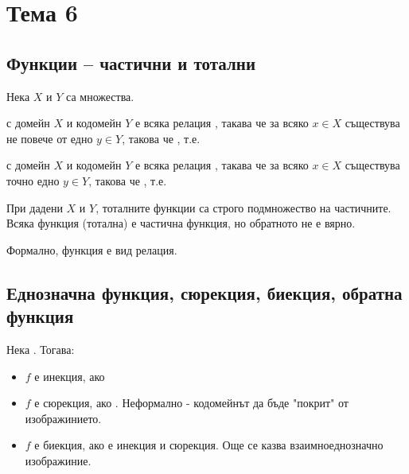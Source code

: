 \section{Тема 6}

\subsection*{Функции – частични и тотални}
Нека \(X\) и \(Y\) са множества.

\begin{definition}
     с домейн \(X\) и кодомейн \(Y\) е всяка 
    релация , такава че за всяко \(x \in X\) съществува не повече от едно 
    \(y \in Y\), такова че , т.е.

\end{definition}

\begin{definition}
     с домейн \(X\) и кодомейн \(Y\) е всяка 
    релация , такава че за всяко \(x \in X\) съществува точно едно 
    \(y \in Y\), такова че , т.е.

\end{definition}

При дадени \(X\) и \(Y\), тоталните функции са строго подмножество на частичните.
Всяка функция (тотална) е частична функция, но обратното не е вярно.

Формално, функция е вид релация.

\subsection*{Еднозначна функция, сюрекция, биекция, обратна функция}
Нека . Тогава: %
\begin{itemize}
    \item \(f\) е инекция, ако 
    \item \(f\) е сюрекция, ако . Неформално - кодомейнът да 
    бъде "покрит" от изображинието.
    \item \(f\) е биекция, ако е инекция и сюрекция. Още се казва взаимноеднозначно изображиние.
\end{itemize}

